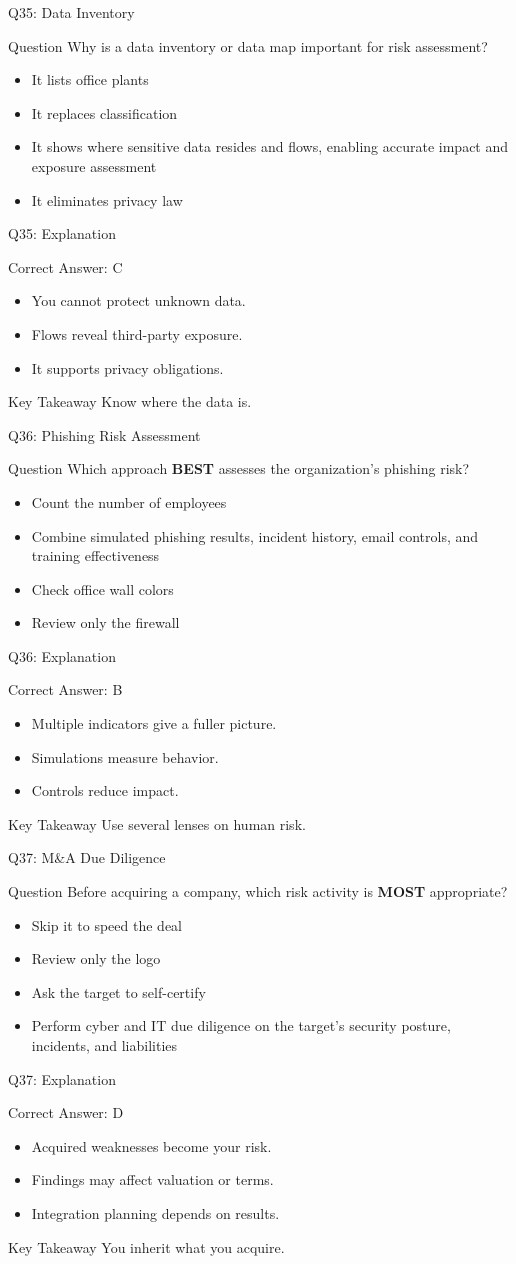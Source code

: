 \documentclass[aspectratio=169]{beamer}
\newcommand{\hq}[7]{%
	\begin{frame}{Q#1: #2}
		\begin{block}{Question}
			#3
		\end{block}
		\begin{itemize}
			#4
		\end{itemize}
	\end{frame}
	\begin{frame}{Q#1: Explanation}
		\begin{block}{Correct Answer: #5}
			\begin{itemize}
				#6
			\end{itemize}
		\end{block}
		\begin{alertblock}{Key Takeaway}
			#7
		\end{alertblock}
	\end{frame}
}
\begin{document}
	\hq{35}{Data Inventory}
	{Why is a data inventory or data map important for risk assessment?}
	{\item[\textbf{(A)}] It lists office plants
		\item[\textbf{(B)}] It replaces classification
		\item[\textbf{(C)}] It shows where sensitive data resides and flows, enabling accurate impact and exposure assessment
		\item[\textbf{(D)}] It eliminates privacy law}
	{C}
	{\item You cannot protect unknown data.
		\item Flows reveal third-party exposure.
		\item It supports privacy obligations.}
	{Know where the data is.}

	\hq{36}{Phishing Risk Assessment}
	{Which approach \textbf{BEST} assesses the organization's phishing risk?}
	{\item[\textbf{(A)}] Count the number of employees
		\item[\textbf{(B)}] Combine simulated phishing results, incident history, email controls, and training effectiveness
		\item[\textbf{(C)}] Check office wall colors
		\item[\textbf{(D)}] Review only the firewall}
	{B}
	{\item Multiple indicators give a fuller picture.
		\item Simulations measure behavior.
		\item Controls reduce impact.}
	{Use several lenses on human risk.}

	\hq{37}{M\&A Due Diligence}
	{Before acquiring a company, which risk activity is \textbf{MOST} appropriate?}
	{\item[\textbf{(A)}] Skip it to speed the deal
		\item[\textbf{(B)}] Review only the logo
		\item[\textbf{(C)}] Ask the target to self-certify
		\item[\textbf{(D)}] Perform cyber and IT due diligence on the target's security posture, incidents, and liabilities}
	{D}
	{\item Acquired weaknesses become your risk.
		\item Findings may affect valuation or terms.
		\item Integration planning depends on results.}
	{You inherit what you acquire.}
\end{document}
